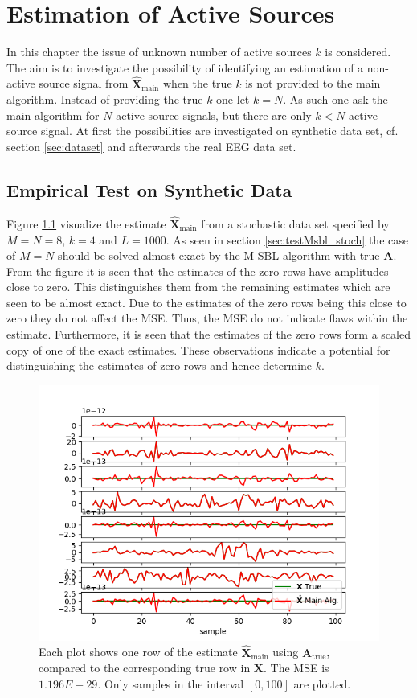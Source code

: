 \chapter{Estimation of Active Sources}\label{ch:estimation_k}
In this chapter the issue of unknown number of active sources $k$ is considered. 
The aim is to investigate the possibility of identifying an estimation of a non-active source signal from $\hat{\textbf{X}}_{\text{main}}$ when the true $k$ is not provided to the main algorithm. 
Instead of providing the true $k$ one let $k = N$.
As such one ask the main algorithm for $N$ active source signals, but there are only $k < N$ active source signal. 
At first the possibilities are investigated on synthetic data set, cf. section \ref{sec:dataset} and afterwards the real EEG data set.   

\section{Empirical Test on Synthetic Data}
Figure \ref{fig:ktest1} visualize the estimate $\hat{\mathbf{X}}_{\text{main}}$ from a stochastic data set specified by $M = N = 8$, $k = 4$ and $L = 1000$. 
As seen in section \ref{sec:testMsbl_stoch} the case of $M = N$ should be solved almost exact by the M-SBL algorithm with true $\mathbf{A}$. 
From the figure it is seen that the estimates of the zero rows have amplitudes close to zero.
This distinguishes them from the remaining estimates which are seen to be almost exact. 
Due to the estimates of the zero rows being this close to zero they do not affect the MSE. 
Thus, the MSE do not indicate flaws within the estimate. 
Furthermore, it is seen that the estimates of the zero rows form a scaled copy of one of the exact estimates. 
These observations indicate a potential for distinguishing the estimates of zero rows and hence determine $k$.     
\begin{figure}[H]
    \centering
	\includegraphics[scale=0.5]{figures/ch_estimate/k_test1.png}
	\caption{Each plot shows one row of the estimate $\hat{\mathbf{X}}_{\text{main}}$ using $\mathbf{A}_{\text{true}}$, compared to the corresponding true row in $\mathbf{X}$. The MSE is $1.196E-29$. Only samples in the interval $[0,100]$ are plotted.}
	\label{fig:ktest1}
\end{figure}
